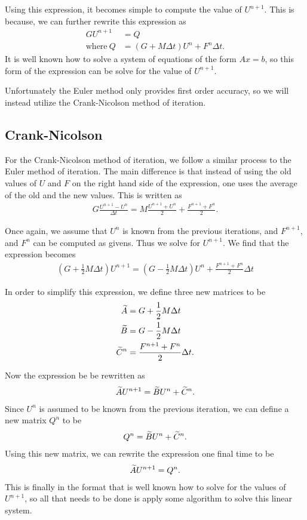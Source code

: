 \documentclass[../fem.tex]{subfile}
\begin{document}
Using this expression, it becomes simple to compute the value of $U^{n+1}$.
This is because, we can further rewrite this expression as
\begin{align*}
  GU^{n+1}&=Q\\\text{where}\ Q&=\left(G+M\Delta t\right)U^n+F^n\Delta t.
\end{align*}
It is well known how to solve a system of equations of the form $Ax=b$, so this
form of the expression can be solve for the value of $U^{n+1}$.

Unfortunately the Euler method only provides first order accuracy, so we will
instead utilize the Crank-Nicolson method of iteration.

\subsection{Crank-Nicolson}%
\label{sub:crank_nicolson}

For the Crank-Nicolson method of iteration, we follow a similar process to the
Euler method of iteration. The main difference is that instead of using the old
values of $U$ and $F$ on the right hand side of the expression, one uses the
average of the old and the new values. This is written as
\begin{align*}
  G\frac{U^{n+1}-U^n}{\Delta t}=M\frac{U^{n+1}+U^n}{2}+\frac{F^{n+1}+F^n}{2}.
\end{align*}

Once again, we assume that $U^n$ is known from the previous iterations, and
$F^{n+1}$, and $F^n$ can be computed as givens. Thus we solve for $U^{n+1}$. We
find that the expression becomes
\begin{align*}
  \left(G+\frac{1}{2}M\Delta t\right)U^{n+1}=\left(G-\frac{1}{2}M\Delta
  t\right)U^n+\frac{F^{n+1}+F^n}{2}\Delta t
\end{align*}

In order to simplify this expression, we define three new matrices to be
\begin{align*}
  \widetilde{A}&=G+\frac{1}{2}M\Delta t\\
  \widetilde{B}&=G-\frac{1}{2}M\Delta t\\
  \widetilde{C}^n&=\frac{F^{n+1}+F^n}{2}\Delta t.
\end{align*}

Now the expression be be rewritten as
\begin{align*}
  \widetilde{A}U^{n+1}=\widetilde{B}U^n+\widetilde{C}^n.
\end{align*}
Since $U^n$ is assumed to be known from the previous iteration, we can define a
new matrix $Q^n$ to be
\begin{align*}
  Q^n=\widetilde{B}U^n+\widetilde{C}^n.
\end{align*}
Using this new matrix, we can rewrite the expression one final time to be
\begin{align*}
  \widetilde{A}U^{n+1}=Q^n.
\end{align*}
This is finally in the format that is well known how to solve for the values of
$U^{n+1}$, so all that needs to be done is apply some algorithm to solve this
linear system.
\end{document}

